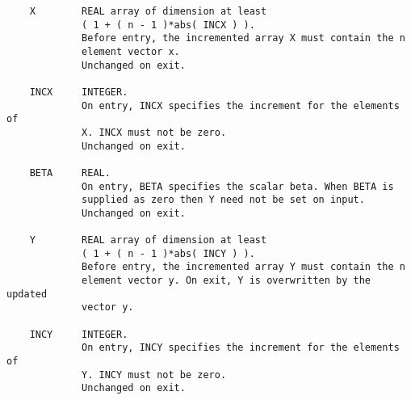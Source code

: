 \documentclass[10pt]{book}
\begin{document}
\begin{verbatim}
    X        REAL array of dimension at least
             ( 1 + ( n - 1 )*abs( INCX ) ).
             Before entry, the incremented array X must contain the n
             element vector x.
             Unchanged on exit.

    INCX     INTEGER.
             On entry, INCX specifies the increment for the elements of
             X. INCX must not be zero.
             Unchanged on exit.

    BETA     REAL.
             On entry, BETA specifies the scalar beta. When BETA is
             supplied as zero then Y need not be set on input.
             Unchanged on exit.

    Y        REAL array of dimension at least
             ( 1 + ( n - 1 )*abs( INCY ) ).
             Before entry, the incremented array Y must contain the n
             element vector y. On exit, Y is overwritten by the updated
             vector y.

    INCY     INTEGER.
             On entry, INCY specifies the increment for the elements of
             Y. INCY must not be zero.
             Unchanged on exit.
\end{verbatim}

\newpage
\end{document}
